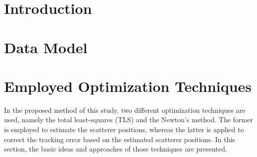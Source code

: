 \documentclass[10pt,twocolumn,a4paper,conference]{IEEEtran}
\begin{document}

\section{Introduction} \label{sec:intro}

%




\section{Data Model} \label{sec:data_model}


\section{Employed Optimization Techniques} %
In the proposed method of this study, two different optimization techniques are used, namely the total least-squares (TLS) and the Newton's method. The former is employed to estimate the scatterer positions, whereas the latter is applied to correct the tracking error  based on the estimated scatterer positions. In this section, the basic ideas and approaches of those techniques are presented. 
\end{document}
